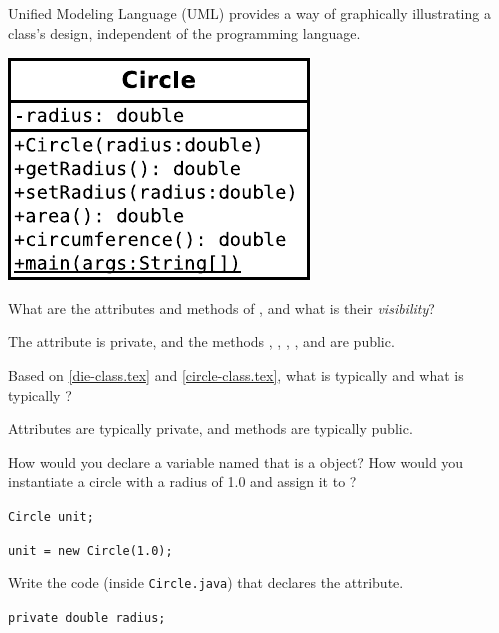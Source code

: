 
Unified Modeling Language (UML) provides a way of graphically illustrating a class’s design, independent of the programming language.

\begin{center}
\includegraphics{Circle.pdf}
\end{center}




\Q What are the attributes and methods of , and what is their \emph{visibility}?

\begin{answer}
The attribute  is private, and the methods , , , , and  are public.
\end{answer}


\Q Based on \ref{die-class.tex} and \ref{circle-class.tex}, what is typically  and what is typically ?

\begin{answer}
Attributes are typically private, and methods are typically public.
\end{answer}


\Q How would you declare a variable named  that is a  object?
How would you instantiate a circle with a radius of 1.0 and assign it to ?

\begin{answer}
\tt Circle unit;

\tt unit = new Circle(1.0);
\end{answer}


\Q Write the code (inside {\tt Circle.java}) that declares the  attribute.

\begin{answer}
\tt private double radius;
\end{answer}


